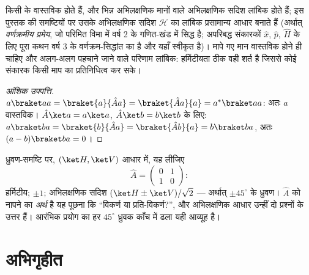 \begin{theorem}[हर्मिटीय क्यों]\label{thm:b3:quantum-formalism:hermitian}
किसी  के  वास्तविक होते हैं, और भिन्न
अभिलक्षणिक मानों वाले अभिलक्षणिक सदिश लांबिक होते हैं; इस पुस्तक की
समष्टियों पर उसके अभिलक्षणिक सदिश $\mathcal H$ का लांबिक प्रसामान्य
आधार बनाते हैं (अर्थात्
\emph{वर्णक्रमीय प्रमेय}, जो परिमित विमा में वर्ष 2 के गणित-खंड में
सिद्ध है; अपरिबद्ध संकारकों $\hat x$, $\hat p$,
$\hat H$ के लिए पूरा कथन वर्ष 3 के वर्णक्रम-सिद्धांत का है और यहाँ
स्वीकृत है)। मापे गए मान वास्तविक होने ही चाहिए और अलग-अलग पहचाने जाने
वाले परिणाम लांबिक: हर्मिटीयता ठीक वही शर्त है जिससे कोई
संकारक किसी माप का प्रतिनिधित्व कर सके।
\end{theorem}

\begin{proof}[आंशिक उपपत्ति]
$a\braket aa = \braket{a}{\hat Aa} = \braket{\hat Aa}{a} =
a^*\braket aa$: अतः $a$ वास्तविक। $\hat A\ket a = a\ket a$, $\hat A\ket b
= b\ket b$ के लिए: $a\braket ba = \braket{b}{\hat Aa} = \braket{\hat
Ab}{a} = b\braket ba$, अतः $(a - b)\braket ba = 0$।
\end{proof}

\begin{example}[एक द्वि-स्तरीय प्रेक्ष्य]\label{ex:b3:quantum-formalism:twolevel}
ध्रुवण-समष्टि पर, $(\ket H, \ket V)$ आधार में, यह लीजिए
\[
\hat A = \begin{pmatrix} 0 & 1\\ 1 & 0\end{pmatrix} :
\]
हर्मिटीय;  $\pm1$; अभिलक्षणिक सदिश $(\ket H \pm
\ket V)/\sqrt2$ --- अर्थात् $\pm45^\circ$ के ध्रुवण।
$\hat A$ को नापने का \emph{अर्थ} है यह पूछना कि ``विकर्ण या
प्रति-विकर्ण?'', और अभिलक्षणिक आधार उन्हीं दो प्रश्नों के उत्तर हैं।
आरंभिक प्रयोग का हर $45^\circ$ ध्रुवक काँच में ढला यही आव्यूह है।
\end{example}

\section{अभिगृहीत}

